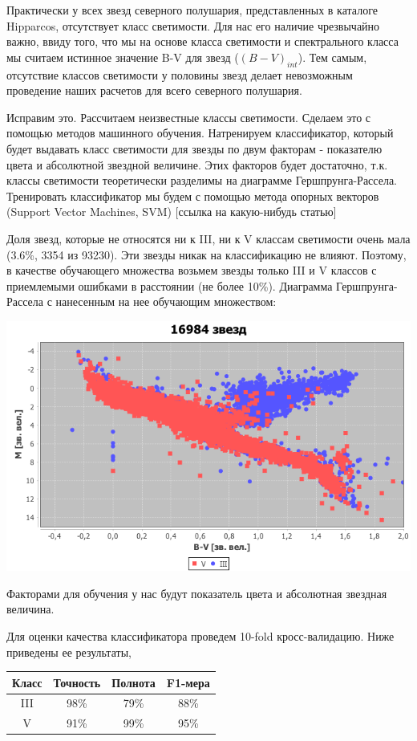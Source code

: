 \documentclass[14pt]{article}
\begin{document}
		Практически у всех звезд северного полушария, представленных в каталоге Hipparcos, отсутствует класс светимости. Для нас его наличие чрезвычайно важно, ввиду того, что мы на основе класса светимости и спектрального класса мы считаем истинное значение B-V для звезд ($(B - V)_{int}$). Тем самым, отсутствие классов светимости у половины звезд делает невозможным проведение наших расчетов для всего северного полушария.
		
		Исправим это. Рассчитаем неизвестные классы светимости. Сделаем это с помощью методов машинного обучения. Натренируем классификатор, который будет выдавать класс светимости для звезды по двум факторам - показателю цвета и абсолютной звездной величине. Этих факторов будет достаточно, т.к. классы светимости теоретически разделимы на диаграмме Гершпрунга-Рассела. Тренировать классификатор мы будем с помощью метода опорных векторов (Support Vector Machines, SVM) [ссылка на какую-нибудь статью]
		
		Доля звезд, которые не относятся ни к III, ни к V классам светимости очень мала (3.6\%, 3354 из 93230). Эти звезды никак на классификацию не влияют. Поэтому, в качестве обучающего множества возьмем звезды только III и V классов с приемлемыми ошибками в расстоянии (не более 10\%). Диаграмма Гершпрунга-Рассела с нанесенным на нее обучающим множеством:
		\begin{center}
			\includegraphics[scale=0.4]{ml-learn.png}   
		\end{center}
		Факторами для обучения у нас будут показатель цвета и абсолютная звездная величина.
		
		Для оценки качества классификатора проведем 10-fold кросс-валидацию. Ниже приведены ее результаты, \\
		\begin{center}
			\begin{tabular} {| c | c | c | c |}
				    \hline
				    Класс    &    Точность   &    Полнота    &    F1-мера     \\
				    \hline
				    III    &    98\%    &    79\%    &    88\% \\		
				    V	&	91\%		&	99\%		&	95\%		\\
				    \hline
			\end{tabular}
		\end{center}
		 	
\end{document}
